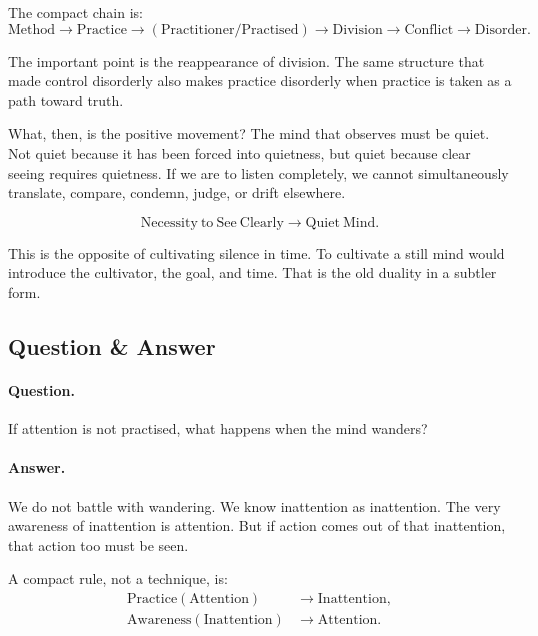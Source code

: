 The compact chain is:
\begin{equation}
\mathrm{Method}
\longrightarrow
\mathrm{Practice}
\longrightarrow
(\mathrm{Practitioner}/\mathrm{Practised})
\longrightarrow
\mathrm{Division}
\longrightarrow
\mathrm{Conflict}
\longrightarrow
\mathrm{Disorder}.
\end{equation}

The important point is the reappearance of division. The same structure that made control disorderly also makes practice disorderly when practice is taken as a path toward truth.

What, then, is the positive movement? The mind that observes must be quiet. Not quiet because it has been forced into quietness, but quiet because clear seeing requires quietness. If we are to listen completely, we cannot simultaneously translate, compare, condemn, judge, or drift elsewhere.

\begin{equation}
\mathrm{Necessity\ to\ See\ Clearly}
\longrightarrow
\mathrm{Quiet\ Mind}.
\end{equation}

This is the opposite of cultivating silence in time. To cultivate a still mind would introduce the cultivator, the goal, and time. That is the old duality in a subtler form.

\subsection{Question \& Answer}

\paragraph{Question.}
If attention is not practised, what happens when the mind wanders?

\paragraph{Answer.}
We do not battle with wandering. We know inattention as inattention. The very awareness of inattention is attention. But if action comes out of that inattention, that action too must be seen.

A compact rule, not a technique, is:
\begin{align}
\mathrm{Practice}(\mathrm{Attention}) &\longrightarrow \mathrm{Inattention},\\
\mathrm{Awareness}(\mathrm{Inattention}) &\longrightarrow \mathrm{Attention}.
\end{align}

